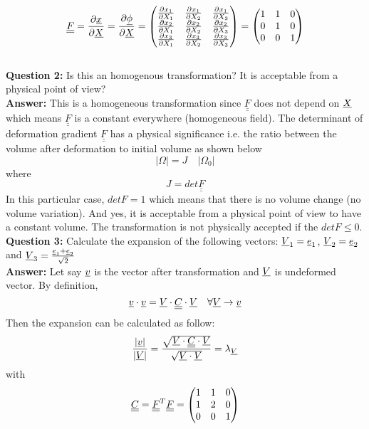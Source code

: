 \documentclass[letter,12pt]{article}
\newcommand{\TT}[1]{\underline{\underline{#1}}}
\newcommand{\T}[1]{\underline{#1}}
\begin{document}
	\begin{equation}
      \TT{F} = \derp{\xu}{\Xu} = \derp{\phiu}{\Xu} = \left( \begin{matrix}
      \derp{x_1}{X_1}  & \derp{x_1}{X_2} & \derp{x_1}{X_3} \\
      \derp{x_2}{X_1} & \derp{x_2}{X_2} & \derp{x_2}{X_3} \\
      \derp{x_3}{X_1} & \derp{x_3}{X_2} & \derp{x_3}{X_3} 
      \end{matrix} \right)=
      \left(
      \begin{matrix}
      1 & 1 & 0 \\
      0 & 1 & 0 \\
      0 & 0 & 1
      \end{matrix}
      \right)
	\end{equation} \\
	
	\noindent \textbf{Question 2:} Is this an homogenous transformation? It is acceptable from a physical point of view? \\
	
	\textbf{Answer:} This is a homogeneous transformation since $\TT{F}$ does not depend on $\underline{X}$ which means $\TT{F}$ is a constant everywhere (homogeneous field). The determinant of deformation gradient $\TT{F}$ has a physical significance i.e. the ratio between the volume after deformation to initial volume as shown below
	\begin{equation}
	|\Omega| = J \quad |\Omega_0|
	\end{equation}
	where 
	\begin{equation}
	J = det \TT{F}
	\end{equation}
	In this particular case, $det F = 1$ which means that there is no volume change (no volume variation). And yes, it is acceptable from a physical point of view to have a constant volume. The transformation is not physically accepted if the $det F \leq 0$. \\

	\noindent \textbf{Question 3:} Calculate the expansion of the following vectors: $\Vu_1 =  \T{e}_1$, $ \Vu_2 = \T{e}_2$ and $\Vu_3 =  \frac{\T{e}_1+\T{e}_2}{\sqrt{2}}$ \\
	
	\textbf{Answer:} Let say $\underline{v}$ is the vector after transformation and $\underline{V}$ is undeformed vector. By definition,
	\begin{equation}
	\underline{v} \cdot \underline{v} = \underline{V} \cdot \underline{\underline{C}} \cdot \underline{V} \quad \forall \underline{V} \rightarrow \underline{v}
	\end{equation}
	Then the expansion can be calculated as follow:
	\begin{equation}
	\frac{|\underline{v}|}{|\underline{V}|} = \frac{\sqrt{\underline{V} \cdot \underline{\underline{C}} \cdot \underline{V}}}{\sqrt{\underline{V} \cdot \underline{V}}} = \lambda_{\underline{V}}
	\end{equation}
	with
	\begin{equation}
	\underline{\underline{C}} = \underline{\underline{F}}^T \underline{\underline{F}} = \left( \begin{matrix}
	1 & 1 & 0 \\
	1 & 2 & 0 \\
	0 & 0 & 1
	\end{matrix} \right)
	\end{equation}
	
\end{document}
